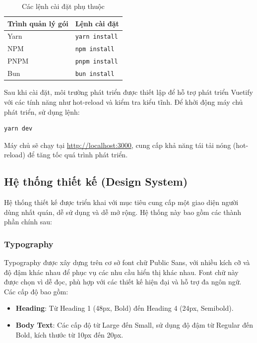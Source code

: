 \begin{table}[H]
\centering
\caption{Các lệnh cài đặt phụ thuộc}
\begin{tabularx}{\textwidth}{|l|X|}
\hline
\textbf{Trình quản lý gói} & \textbf{Lệnh cài đặt} \\ \hline
Yarn & \texttt{yarn install} \\ \hline
NPM & \texttt{npm install} \\ \hline
PNPM & \texttt{pnpm install} \\ \hline
Bun & \texttt{bun install} \\ \hline
\end{tabularx}
\end{table}

Sau khi cài đặt, môi trường phát triển được thiết lập để hỗ trợ phát triển Vuetify với các tính năng như hot-reload và kiểm tra kiểu tĩnh. Để khởi động máy chủ phát triển, sử dụng lệnh:

\begin{verbatim}
yarn dev
\end{verbatim}

Máy chủ sẽ chạy tại \href{http://localhost:3000}{http://localhost:3000}, cung cấp khả năng tái tải nóng (hot-reload) để tăng tốc quá trình phát triển.
\subsection*{Hệ thống thiết kế (Design System)}

Hệ thống thiết kế được triển khai với mục tiêu cung cấp một giao diện người dùng nhất quán, dễ sử dụng và dễ mở rộng. Hệ thống này bao gồm các thành phần chính sau:

\subsubsection*{Typography}
Typography được xây dựng trên cơ sở font chữ Public Sans, với nhiều kích cỡ và độ đậm khác nhau để phục vụ các nhu cầu hiển thị khác nhau. Font chữ này được chọn vì dễ đọc, phù hợp với các thiết kế hiện đại và hỗ trợ đa ngôn ngữ. Các cấp độ bao gồm:

\begin{itemize}
    \item \textbf{Heading}: Từ Heading 1 (48px, Bold) đến Heading 4 (24px, Semibold).
    \item \textbf{Body Text}: Các cấp độ từ Large đến Small, sử dụng độ đậm từ Regular đến Bold, kích thước từ 10px đến 20px.
\end{itemize}

